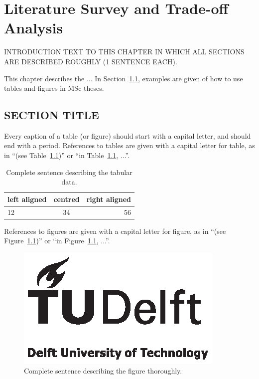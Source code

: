 \chapter{Literature Survey and Trade-off Analysis}
\label{chp:CHAPTERTITLE}
INTRODUCTION TEXT TO THIS CHAPTER IN WHICH ALL SECTIONS ARE DESCRIBED ROUGHLY (1 SENTENCE EACH).

This chapter describes the ... In Section~\ref{sec:SECTIONTITLE}, examples are given of how to use tables and figures in MSc theses.

\section{SECTION TITLE}
\label{sec:SECTIONTITLE}

Every caption of a table (or figure) should start with a capital letter, and should end with a period. References to tables are given with a capital letter for table, as in ``(see Table~\ref{tab:EXAMPLETABLE})'' or ``in Table~\ref{tab:EXAMPLETABLE}, ...''.

\begin{table}[htb]
\centering
\begin{tabular}{|l|c|r|}
\hline %
left aligned & centred & right aligned \\
\hline \hline
12           & 34      & 56            \\
\hline
\end{tabular}
\caption{Complete sentence describing the tabular data.}
\label{tab:EXAMPLETABLE}
\end{table}

References to figures are given with a capital letter for figure, as in ``(see Figure~\ref{fig:EXAMPLEFIGURE})'' or ``in Figure~\ref{fig:EXAMPLEFIGURE}, ...''.

\cite{b}
\cite{a}

\begin{figure}[htb]
\includegraphics[angle=180,width=\textwidth]{pics/TUD_logo_zw}
\caption{Complete sentence describing the figure thoroughly.}
\label{fig:EXAMPLEFIGURE}
\end{figure}


